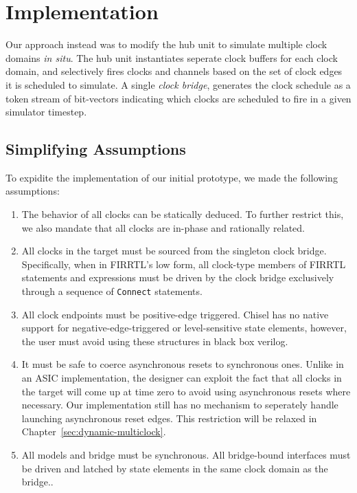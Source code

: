 

\section{Implementation}

Our approach instead was to modify the hub unit to simulate multiple clock
domains \emph{in situ}. The hub unit instantiates seperate clock buffers for
each clock domain, and selectively fires clocks and channels based on the set
of clock edges it is scheduled to simulate. A single \emph{clock bridge},
generates the clock schedule as a token stream of bit-vectors indicating which
clocks are scheduled to fire in a given simulator timestep.

\subsection{Simplifying Assumptions}


To expidite the implementation of our initial prototype, we made the following assumptions:

\begin{enumerate}
\item The behavior of all clocks can be statically deduced. To further restrict
    this, we also mandate that all clocks are in-phase and rationally related.

\item All clocks in the target must be sourced from the singleton clock bridge.
    Specifically, when in FIRRTL's low form, all clock-type members of FIRRTL
    statements and expressions must be driven by the clock bridge
    exclusively through a sequence of \texttt{Connect} statements.

\item All clock endpoints must be positive-edge triggered. Chisel has no
    native support for negative-edge-triggered or level-sensitive state elements, however, the
    user must avoid using these structures in black box verilog.

\item It must be safe to coerce asynchronous resets to synchronous ones. Unlike in 
    an ASIC implementation, the designer can exploit the fact that all clocks
    in the target will come up at time zero to avoid using asynchronous
    resets where necessary.  Our implementation still has no mechanism to
    seperately handle launching asynchronous reset edges. This restriction
    will be relaxed in Chapter~\ref{sec:dynamic-multiclock}.
\item All models and bridge must be synchronous. All bridge-bound interfaces
    must be driven and latched by state elements in the same clock domain as
        the bridge..
\end{enumerate}

